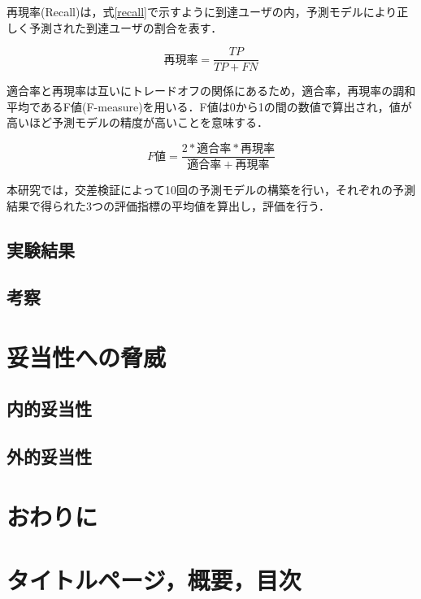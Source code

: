 \documentclass[11pt,dvipdfmx]{jreport}
\begin{document}
再現率(Recall)は，式\ref{recall}で示すように到達ユーザの内，予測モデルにより正しく予測された到達ユーザの割合を表す．

\begin{equation}
  再現率 = \frac{TP}{TP + FN} \label{recall}
\end{equation}
\vspace{.5mm}

適合率と再現率は互いにトレードオフの関係にあるため，適合率，再現率の調和平均であるF値(F-measure)を用いる．F値は0から1の間の数値で算出され，値が高いほど予測モデルの精度が高いことを意味する．

\begin{equation}
  F値 = \frac{2 * 適合率 * 再現率}{適合率 + 再現率} \label{f-measure}
\end{equation}
\vspace{.5mm}

本研究では，交差検証によって10回の予測モデルの構築を行い，それぞれの予測結果で得られた3つの評価指標の平均値を算出し，評価を行う．

\section{実験結果}



\section{考察}

\chapter{妥当性への脅威}
\section{内的妥当性}
\section{外的妥当性}

\chapter{おわりに}


\chapter{タイトルページ，概要，目次}
\end{document}

